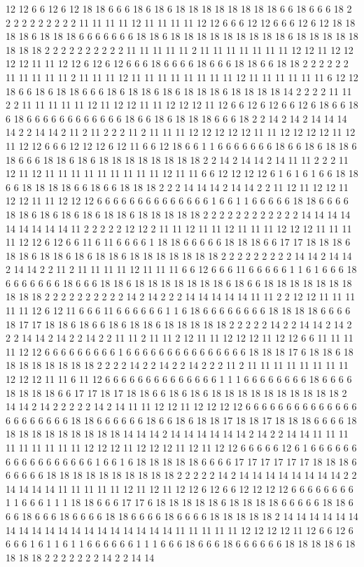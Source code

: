 12 12 6 6 12 6 12 18 18 6 6 6 18 6 18 6 18 18 18 18 18 18 18 18 6 6 18 6 6 6 18 2 2 2 2 2 2 2 2 2 2 11 11 11 11 12 11 11 11 11 12 12 6 6 6 12 12 6 6 6 12 6 12 18 18 18 18 6 18 18 18 6 6 6 6 6 6 6 18 18 6 18 18 18 18 18 18 18 18 18 6 18 18 18 18 18 18 18 18 2 2 2 2 2 2 2 2 2 2 11 11 11 11 11 2 11 11 11 11 11 11 11 12 12 11 12 12 12 12 11 11 12 12 6 12 6 12 6 6 6 18 6 6 6 6 18 6 6 6 18 18 6 6 18 18 2 2 2 2 2 2 11 11 11 11 11 2 11 11 11 12 11 11 11 11 11 11 11 11 12 11 11 11 11 11 11 6 12 12 18 6 6 18 6 18 18 6 6 6 18 6 18 18 6 18 6 18 18 18 6 18 18 18 18 14 2 2 2 2 11 11 2 2 11 11 11 11 11 12 11 12 12 11 11 12 12 12 11 12 6 6 12 6 12 6 6 12 6 18 6 6 18 6 18 6 6 6 6 6 6 6 6 6 6 6 6 18 6 6 18 6 18 18 18 6 6 6 18 2 2 14 2 14 2 14 14 14 14 2 2 14 14 2 11 2 11 2 2 2 11 2 11 11 11 12 12 12 12 12 11 11 12 12 12 12 11 12 11 12 12 6 6 6 12 12 12 6 12 11 6 6 12 18 6 6 1 1 6 6 6 6 6 6 6 18 6 6 18 6 18 18 6 18 6 6 6 18 18 6 18 6 18 18 18 18 18 18 18 18 2 2 14 2 14 14 2 14 11 11 2 2 2 11 12 11 12 11 11 11 11 11 11 11 11 11 12 11 11 6 6 12 12 12 12 6 1 6 1 6 1 6 6 18 18 6 6 18 18 18 18 6 6 18 6 6 18 18 18 2 2 2 14 14 14 2 14 14 2 2 11 12 11 12 12 11 12 12 11 11 12 12 12 6 6 6 6 6 6 6 6 6 6 6 6 6 6 1 6 6 1 1 6 6 6 6 6 18 18 6 6 6 6 18 18 6 18 6 18 6 18 6 18 18 6 18 18 18 18 18 2 2 2 2 2 2 2 2 2 2 2 2 14 14 14 14 14 14 14 14 14 11 2 2 2 2 2 12 12 2 11 11 12 11 11 12 11 11 11 12 12 12 11 11 11 11 12 12 6 12 6 6 11 6 11 6 6 6 6 1 18 18 6 6 6 6 6 18 18 18 6 6 17 17 18 18 18 6 18 18 6 18 18 6 18 6 18 18 6 18 18 18 18 18 18 18 2 2 2 2 2 2 2 2 2 14 14 2 14 14 2 14 14 2 2 11 2 11 11 11 11 12 11 11 11 6 6 12 6 6 6 11 6 6 6 6 6 1 1 6 1 6 6 6 18 6 6 6 6 6 6 6 18 6 6 6 18 18 6 18 18 18 18 18 18 18 6 18 6 6 18 18 18 18 18 18 18 18 18 18 2 2 2 2 2 2 2 2 2 2 14 2 14 2 2 2 14 14 14 14 14 11 11 2 2 12 12 11 11 11 11 11 12 6 12 11 6 6 6 11 6 6 6 6 6 6 1 1 6 18 6 6 6 6 6 6 6 6 18 18 18 18 6 6 6 6 18 17 17 18 18 6 18 6 6 18 6 18 18 6 18 18 18 18 18 2 2 2 2 2 14 2 2 14 14 2 14 2 2 2 14 14 2 14 2 2 14 2 2 11 11 2 11 11 2 12 11 11 12 12 12 11 12 12 6 6 11 11 11 11 12 12 6 6 6 6 6 6 6 6 6 1 6 6 6 6 6 6 6 6 6 6 6 6 6 6 6 18 18 18 17 6 18 18 6 18 18 18 18 18 18 18 18 2 2 2 2 14 2 2 14 2 2 14 2 2 2 11 2 11 11 11 11 11 11 11 11 12 12 12 11 11 6 11 12 6 6 6 6 6 6 6 6 6 6 6 6 6 6 1 1 1 6 6 6 6 6 6 6 6 18 6 6 6 6 18 18 18 18 6 6 17 17 18 17 18 18 6 6 18 6 18 6 18 18 18 18 18 18 18 18 18 18 2 14 14 2 14 2 2 2 2 2 14 2 14 11 11 12 12 11 12 12 12 12 6 6 6 6 6 6 6 6 6 6 6 6 6 6 6 6 6 6 6 6 6 6 18 18 6 6 6 6 6 6 18 6 6 18 6 18 18 17 18 18 17 18 18 18 6 6 6 6 18 18 18 18 18 18 18 18 18 18 14 14 14 2 14 14 14 14 14 14 2 14 2 2 14 14 11 11 11 11 11 11 11 11 11 12 12 12 11 12 12 12 11 12 11 12 12 6 6 6 6 6 12 6 1 6 6 6 6 6 6 6 6 6 6 6 6 6 6 6 6 6 1 6 6 1 6 18 18 18 18 18 6 6 6 6 17 17 17 17 17 17 18 18 18 6 6 6 6 6 6 18 18 18 18 18 18 18 18 18 18 2 2 2 2 2 14 2 14 14 14 14 14 14 14 14 2 2 14 14 14 14 11 11 11 11 11 12 11 12 11 12 12 6 12 6 6 12 12 12 12 6 6 6 6 6 6 6 6 1 1 6 6 6 1 1 1 18 18 6 6 6 17 17 6 18 18 18 18 18 6 18 18 18 18 6 6 6 6 6 18 18 6 6 6 18 6 6 6 18 6 6 6 6 18 18 6 6 6 6 18 6 6 6 6 18 18 18 18 18 2 14 14 14 14 14 14 14 14 14 14 14 14 14 14 14 14 14 14 14 11 11 11 11 11 12 12 12 12 11 12 6 6 12 6 6 6 6 1 6 1 1 6 1 1 6 6 6 6 6 6 1 1 1 6 6 6 18 6 6 6 18 6 6 6 6 6 6 18 18 18 18 6 18 18 18 18 2 2 2 2 2 2 2 14 2 2 14 14 
